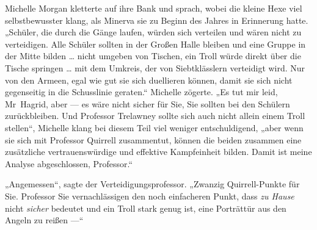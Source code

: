 Michelle Morgan kletterte auf ihre Bank und sprach, wobei die kleine Hexe viel selbstbewusster klang, als Minerva sie zu Beginn des Jahres in Erinnerung hatte.
„Schüler, die durch die Gänge laufen, würden sich verteilen und wären nicht zu verteidigen. Alle Schüler sollten in der Großen Halle bleiben und eine Gruppe in der Mitte bilden … nicht umgeben von Tischen, ein Troll würde direkt über die Tische springen … mit dem Umkreis, der von Siebtklässlern verteidigt wird. Nur von den Armeen, egal wie gut sie sich duellieren können, damit sie sich nicht gegenseitig in die Schusslinie geraten.“ Michelle zögerte.
„Es tut mir leid, Mr~Hagrid, aber — es wäre nicht sicher für Sie, Sie sollten bei den Schülern zurückbleiben. Und Professor Trelawney sollte sich auch nicht allein einem Troll stellen“, Michelle klang bei diesem Teil viel weniger entschuldigend, „aber wenn sie sich mit Professor Quirrell zusammentut, können die beiden zusammen eine zusätzliche vertrauenswürdige und effektive Kampfeinheit bilden. Damit ist meine Analyse abgeschlossen, Professor.“

„Angemessen“, sagte der Verteidigungsprofessor.
„Zwanzig Quirrell-Punkte für Sie. Professor Sie vernachlässigen den noch einfacheren Punkt, dass \emph{zu Hause} nicht \emph{sicher} bedeutet und ein Troll stark genug ist, eine Porträttür aus den Angeln zu reißen —“

